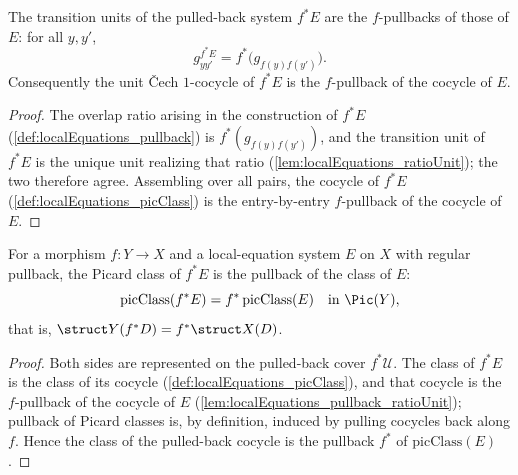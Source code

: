 \begin{lemma}
  \label{lem:localEquations_pullback_ratioUnit}
  \leanok
  The transition units of the pulled-back system \(f^{*}E\) are the \(f\)-pullbacks of those of
  \(E\): for all \(y, y'\),
  \[
    g^{f^{*}E}_{y y'} = f^{*}\bigl(g_{f(y)f(y')}\bigr).
  \]
  Consequently the unit \v Cech \(1\)-cocycle of \(f^{*}E\) is the \(f\)-pullback of the cocycle of
  \(E\).
\end{lemma}
\begin{proof}
  \leanok
  The overlap ratio arising in the construction of \(f^{*}E\) (\ref{def:localEquations_pullback})
  is \(f^{*}(g_{f(y)f(y')})\), and the transition unit of \(f^{*}E\) is the unique unit realizing
  that ratio (\ref{lem:localEquations_ratioUnit}); the two therefore agree. Assembling over all
  pairs, the cocycle of \(f^{*}E\) (\ref{def:localEquations_picClass}) is the entry-by-entry
  \(f\)-pullback of the cocycle of \(E\).
\end{proof}

\begin{theorem}
  \label{thm:localEquations_picClass_pullback}
  \leanok
  For a morphism \(f \colon Y \to X\) and a local-equation system \(E\) on \(X\) with regular
  pullback, the Picard class of \(f^{*}E\) is the pullback of the class of \(E\):
  \[
    \mathrm{picClass}(f^{*}E) = f^{*}\,\mathrm{picClass}(E) \quad\text{in } \Pic(Y),
  \]
  that is, \(\struct Y(f^{*}D) = f^{*}\struct X(D)\).
\end{theorem}
\begin{proof}
  \leanok
  Both sides are represented on the pulled-back cover \(f^{*}\mathcal U\). The class of \(f^{*}E\)
  is the class of its cocycle (\ref{def:localEquations_picClass}), and that cocycle is the
  \(f\)-pullback of the cocycle of \(E\) (\ref{lem:localEquations_pullback_ratioUnit}); pullback of
  Picard classes is, by definition, induced by pulling cocycles back along \(f\). Hence the class
  of the pulled-back cocycle is the pullback \(f^{*}\) of \(\mathrm{picClass}(E)\).
\end{proof}

